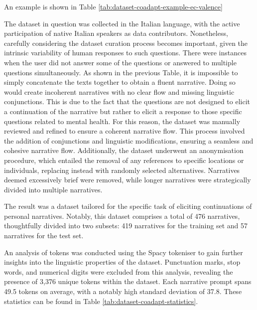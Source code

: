 
An example is shown in Table \ref{tab:dataset-coadapt-example-ec-valence}

The dataset in question was collected in the Italian language, with the active participation of native Italian speakers as data contributors. Nonetheless, carefully considering the dataset curation process becomes important, given the intrinsic variability of human responses to such questions. There were instances when the user did not answer some of the questions or answered to multiple questions simultaneously. As shown in the previous Table, it is impossible to simply concatenate the texts together to obtain a fluent narrative. Doing so would create incoherent narratives with no clear flow and missing linguistic conjunctions. This is due to the fact that the questions are not designed to elicit a continuation of the narrative but rather to elicit a response to those specific questions related to mental health.
For this reason, the dataset was manually reviewed and refined to ensure a coherent narrative flow. This process involved the addition of conjunctions and linguistic modifications, ensuring a seamless and cohesive narrative flow. Additionally, the dataset underwent an anonymisation procedure, which entailed the removal of any references to specific locations or individuals, replacing instead with randomly selected alternatives. Narratives deemed excessively brief were removed, while longer narratives were strategically divided into multiple narratives.
% 

The result was a dataset tailored for the specific task of eliciting continuations of personal narratives. Notably, this dataset comprises a total of 476 narratives, thoughtfully divided into two subsets: 419 narratives for the training set and 57 narratives for the test set.
% 

An analysis of tokens was conducted using the Spacy tokeniser to gain further insights into the linguistic properties of the dataset. Punctuation marks, stop words, and numerical digits were excluded from this analysis, revealing the presence of 3,376 unique tokens within the dataset. Each narrative prompt spans 49.5 tokens on average, with a notably high standard deviation of 37.8. These statistics can be found in Table \ref{tab:dataset-coadapt-statistics}. 

